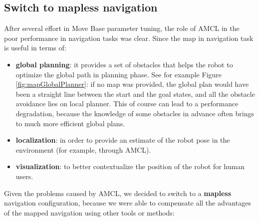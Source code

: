 \subsection{Switch to mapless navigation}
After several effort in Move Base parameter tuning, the role of  \ac{AMCL} in the poor performance in navigation tasks was clear. Since the map in navigation task is useful in terms of:
\begin{itemize}
	\item \textbf{global planning}: it provides a set of obstacles that helps the robot to optimize the global path in planning phase. See for example Figure \ref{fig:mapGlobalPlanner}: if no map was provided, the global plan would have been a straight line between the start and the goal states, and all the obstacle avoidance lies on local planner. This of course can lead to a performance degradation, because the knowledge of some obstacles in advance often brings to much more efficient global plans.
	\item \textbf{localization}: in order to provide an estimate of the robot pose in the environment (for example, through \ac{AMCL}).
	\item \textbf{visualization}: to better contextualize the position of the robot for human users. 
\end{itemize}

Given the problems caused by \ac{AMCL}, we decided to switch to a \textbf{mapless} navigation configuration, because we were able to compensate all the advantages of the mapped navigation using other tools or methods:

